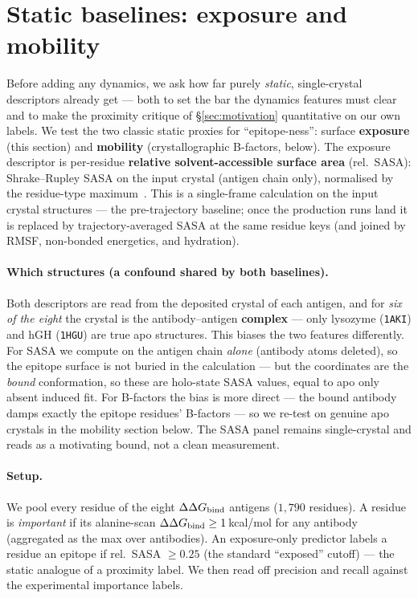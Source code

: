 \section{Static baselines: exposure and mobility}\label{sec:baseline}

Before adding any dynamics, we ask how far purely \emph{static}, single-crystal descriptors already
get --- both to set the bar the dynamics features must clear and to make the proximity critique of
\S\ref{sec:motivation} quantitative on our own labels. We test the two classic static proxies for
``epitope-ness'': surface \textbf{exposure} (this section) and \textbf{mobility} (crystallographic
B-factors, below). The exposure descriptor is per-residue \textbf{relative solvent-accessible
surface area} (rel.\ SASA): Shrake--Rupley SASA on the input crystal (antigen chain only), normalised
by the residue-type maximum~\cite{tien2013}. This is a single-frame calculation on the input crystal
structures --- the pre-trajectory baseline; once the production runs land it is replaced by
trajectory-averaged SASA at the same residue keys (and joined by RMSF, non-bonded energetics, and
hydration).

\paragraph{Which structures (a confound shared by both baselines).} Both descriptors are read from the
deposited crystal of each antigen, and for \emph{six of the eight} the crystal is the antibody--antigen
\textbf{complex} --- only lysozyme (\texttt{1AKI}) and hGH (\texttt{1HGU}) are true apo structures. This
biases the two features differently. For SASA we compute on the antigen chain \emph{alone} (antibody
atoms deleted), so the epitope surface is not buried in the calculation --- but the coordinates are the
\emph{bound} conformation, so these are holo-state SASA values, equal to apo only absent induced fit.
For B-factors the bias is more direct --- the bound antibody damps exactly the epitope residues'
B-factors --- so we re-test on genuine apo crystals in the mobility section below. The SASA panel
remains single-crystal and reads as a motivating bound, not a clean measurement.

\paragraph{Setup.} We pool every residue of the eight $\Delta\Delta G_{\mathrm{bind}}$ antigens ($1{,}790$ residues).
A residue is \emph{important} if its alanine-scan $\Delta\Delta G_{\mathrm{bind}} \geq 1$\,kcal/mol for any antibody
(aggregated as the max over antibodies). An exposure-only predictor labels a residue an epitope
if rel.\ SASA $\geq 0.25$ (the standard ``exposed'' cutoff) --- the static analogue of a proximity
label. We then read off precision and recall against the experimental importance labels.

